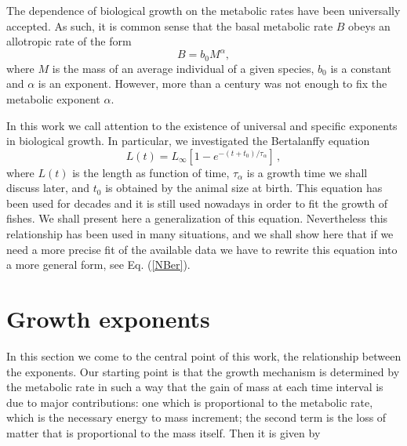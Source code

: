 \documentclass[10pt]{iopart}
\begin{document}
The dependence of biological growth on the metabolic rates have been universally accepted. As such, it is common sense that the basal metabolic rate $B$ obeys an allotropic rate of the form \cite{Bertalanffy38a,Bertalanffy57,West97,West99,Brown05,Hatton15,Cebrian16,Rubner1883,Kleiber32,Banavar10,Agutter11}\\

\begin{equation}
B = b_0M^{\alpha},
\end{equation}
where $M$ is the mass of an average individual of a given species, $b_0$ is a constant and $\alpha$ is an exponent. However, more than a century was not enough to fix the  metabolic exponent $\alpha$.

In this work we call attention to the existence of universal and specific exponents in biological growth. In particular, we investigated the Bertalanffy equation \cite{Bertalanffy38a,Bertalanffy57}
\begin{equation}
L(t) = L_\infty \left[ 1 - e^{-(t+t_0)/\tau_\alpha} \right]\,,
\label{Ber}
\end{equation}
where $L(t)$ is the length as function of time, $\tau_\alpha$ is a growth time we shall discuss later, and $t_0$ is obtained by the animal size at birth. This equation has been used for decades and it is still used nowadays  in order to fit
the growth of fishes. We shall present here a generalization of this equation. Nevertheless this relationship has been used in many situations, and we shall show here that if we need a more precise fit of the available data we have to rewrite this equation into a more general form, see
Eq. (\ref{NBer}).

\section{Growth exponents}
In this section we come to the central point of this work, the relationship between the exponents. Our starting point is that the growth mechanism is determined by the metabolic rate in such a way that the gain of mass at each time interval is due to major contributions: one which is proportional to the metabolic rate, which is the necessary energy to mass increment; the second term is the loss of matter that is proportional to the mass itself. Then it is given by \\ 
\end{document}
